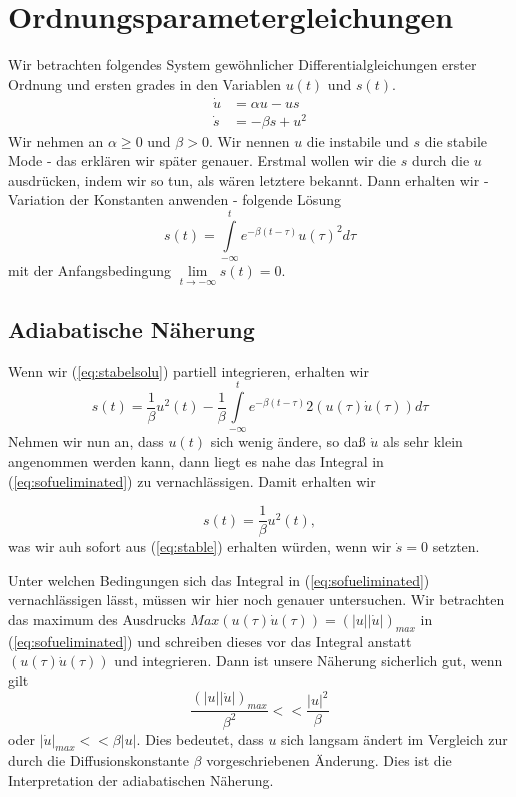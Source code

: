 \section{Ordnungsparametergleichungen}
Wir betrachten folgendes System gewöhnlicher Differentialgleichungen erster
Ordnung und ersten grades in den Variablen $u(t)$ und $s(t)$.
\begin{align} 
  \dot{u}&=\alpha u-us
  \label{eq:unstable}\\
  \dot{s}&=-\beta s+u^2
  \label{eq:stable}
\end{align}
Wir nehmen an $\alpha\ge0$ und $\beta>0$. Wir nennen $u$ die instabile und $s$
die stabile Mode - das erklären wir später genauer. Erstmal wollen wir die $s$
durch die $u$ ausdrücken, indem wir so tun, als wären letztere bekannt. Dann
erhalten wir - Variation der Konstanten anwenden - folgende Lösung
\begin{equation}
  s(t)=\int\limits_{-\infty}^{t}e^{-\beta(t-\tau)}u(\tau)^2d\tau
  \label{eq:stabelsolu}
\end{equation}
mit der Anfangsbedingung $\lim\limits_{t\rightarrow -\infty}s(t)=0$.
\subsection{Adiabatische Näherung}
Wenn wir (\ref{eq:stabelsolu}) partiell integrieren, erhalten wir
\begin{equation}
  s(t)=\frac{1}{\beta}u^2(t)-\frac{1}{\beta}\int\limits_{-\infty}^{t}e^{-\beta(t-\tau)}
  2(u(\tau)\dot u(\tau))d\tau
  \label{eq:sofueliminated}
\end{equation}
Nehmen wir nun an, dass $u(t)$ sich wenig ändere, so daß $\dot u$ als sehr
klein angenommen werden kann, dann liegt es nahe das Integral in
(\ref{eq:sofueliminated}) zu vernachlässigen. Damit erhalten wir

\begin{equation}
  s(t)=\frac{1}{\beta}u^2(t),
  \label{eq:sapprox}
\end{equation}
was wir auh sofort aus (\ref{eq:stable}) erhalten würden, wenn wir $\dot s=0$
setzten.

Unter welchen Bedingungen sich das  Integral in (\ref{eq:sofueliminated})
vernachlässigen lässt, müssen wir hier noch genauer untersuchen. Wir betrachten
das maximum des Ausdrucks $Max(u(\tau)\dot u(\tau))=(|u||\dot u|)_{max}$ in
(\ref{eq:sofueliminated}) und schreiben dieses vor das Integral anstatt
$(u(\tau)\dot u(\tau))$ und integrieren. Dann ist unsere Näherung sicherlich
gut, wenn gilt
\begin{equation}
\frac{(|u||\dot u|)_{max}}{\beta^2}<<\frac{|u|^2}{\beta}
  \label{eq:BedElim}
\end{equation}
oder $ |\dot u|_{max}<<\beta|u|$. Dies bedeutet, dass $u$ sich langsam ändert
im Vergleich zur durch die Diffusionskonstante $\beta$ vorgeschriebenen
Änderung. Dies ist die Interpretation der adiabatischen Näherung.

